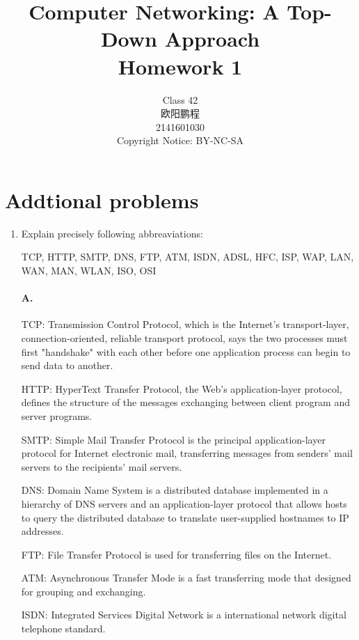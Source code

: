 \documentclass[]{article}
\title{Computer Networking: A Top-Down Approach \\ Homework 1}
\author{Class 42 \\ 欧阳鹏程 \\ 2141601030 \\ Copyright Notice: BY-NC-SA}
\begin{document}
\maketitle


\section{Addtional problems}

\begin{enumerate}
	\item 
	Explain precisely following abbreaviations:
	\begin{itemize}
		\subitem
		TCP,
		HTTP,
		SMTP,
		DNS,
		FTP,
		ATM,
		ISDN,
		ADSL,
		HFC,
		ISP,
		WAP,
		LAN,
		WAN,
		MAN,
		WLAN,
		ISO,
		OSI
	\end{itemize}

	\paragraph{A.}
	TCP: Transmission Control Protocol, which is the Internet's transport-layer, connection-oriented, reliable transport protocol, says the two processes must first "handshake" with each other before one application process can begin to send data to another.
	
	\begin{adjustwidth}{0.05cm}{0cm}
		\qquad HTTP: HyperText Transfer Protocol, the Web's application-layer protocol, defines the structure of the messages exchanging between client program and server programs.
		
		\qquad SMTP: Simple Mail Transfer Protocol is the principal application-layer protocol for Internet electronic mail, transferring messages from senders' mail servers to the recipients' mail servers.
		
		\qquad DNS: Domain Name System is a distributed database implemented in a hierarchy of DNS servers and an application-layer protocol that allows hosts to query the distributed database to translate user-supplied hostnames to IP addresses.
		
		\qquad FTP: File Transfer Protocol is used for transferring files on the Internet.
		
		\qquad ATM: Asynchronous Transfer Mode is a fast transferring mode that designed for grouping and exchanging.
		
		\qquad ISDN: Integrated Services Digital Network is a international network digital telephone standard.
		

\end{adjustwidth}
\end{enumerate}
\end{document}
